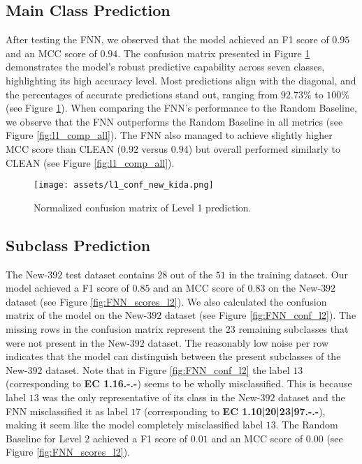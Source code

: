\documentclass{bioinfo}
\begin{document}

\subsection{Main Class Prediction}
After testing the FNN, we observed that the model achieved an F1 score of $0.95$ and an MCC score of $0.94$. 
The confusion matrix presented in Figure \ref{fig:FNN_conf_l1} demonstrates the model's robust predictive capability across seven classes, 
highlighting its high accuracy level. Most predictions align with the diagonal, and the percentages of accurate predictions stand out, 
ranging from $92.73\%$ to $100\%$ (see Figure \ref{fig:FNN_conf_l1}).
When comparing the FNN's performance to the Random Baseline, we observe that the FNN outperforms the Random Baseline in all metrics (see Figure \ref{fig:l1_comp_all}).
The FNN also managed to achieve slightly higher MCC score than CLEAN ($0.92$ versus $0.94$) but overall performed similarly to CLEAN (see Figure \ref{fig:l1_comp_all}).

\begin{figure}[!ht]
\texttt{[image: assets/l1\_conf\_new\_kida.png]}
\caption{Normalized confusion matrix of Level 1 prediction.}\label{fig:FNN_conf_l1}
\end{figure}

\subsection{Subclass Prediction}
The New-$392$ test dataset contains $28$ out of the $51$ in the training dataset.
Our model achieved a F1 score of $0.85$ and an MCC score of $0.83$ on the New-$392$ dataset (see Figure \ref{fig:FNN_scores_l2}).
We also calculated the confusion matrix of the model on the New-$392$ dataset (see Figure \ref{fig:FNN_conf_l2}).
The missing rows in the confusion matrix represent the $23$ remaining subclasses that were not present in the New-$392$ dataset.
The reasonably low noise per row indicates that the model can distinguish between the present subclasses of the New-$392$ dataset.
Note that in Figure \ref{fig:FNN_conf_l2} the label $13$ (corresponding to \textbf{EC 1.16.-.-}) seems to be wholly misclassified.
This is because label $13$ was the only representative of its class in the New-$392$ dataset and
the FNN misclassified it as label $17$ (corresponding to \textbf{EC 1.10|20|23|97.-.-}), making it seem like the model completely misclassified label $13$.
The Random Baseline for Level $2$ achieved a F1 score of $0.01$ and an MCC score of $0.00$ (see Figure \ref{fig:FNN_scores_l2}).
\end{document}
